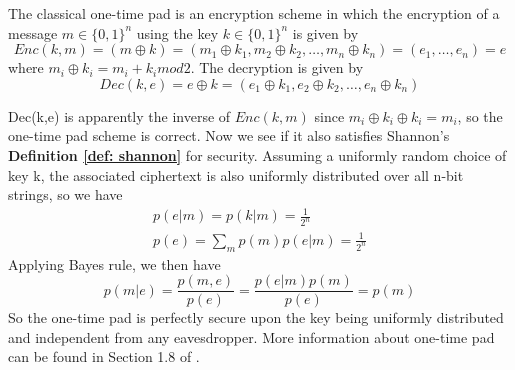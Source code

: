 
\begin{definition} \label{def: classical one-time pad scheme}
The classical one-time pad is an encryption scheme in which the encryption of a message $m \in \{0, 1\}^n$ using the key $k \in \{0, 1\}^n$ is given by
\begin{equation}
    Enc(k,m)=(m \oplus k)=(m_1 \oplus k_1, m_2 \oplus k_2, \hdots, m_n \oplus k_n)=(e_1, \hdots, e_n)=e
\end{equation}
where $m_i \oplus k_i = m_i + k_i mod 2$. The decryption is given by
\begin{equation}
Dec(k, e)=e \oplus k = (e_1 \oplus k_1, e_2 \oplus k_2, \hdots, e_n \oplus k_n)
\end{equation}
\end{definition}

Dec(k,e) is apparently the inverse of $Enc(k,m)$ since $m_i \oplus k_i \oplus k_i=m_i$, so the one-time pad scheme is correct. Now we see if it also satisfies Shannon's \textbf{Definition \ref{def: shannon}} for security. Assuming a uniformly random choice of key k, the associated ciphertext is also uniformly distributed over all n-bit strings, so we have 
\begin{gather}
    p(e|m)=p(k|m)=\frac{1}{2^n}\\
    p(e)=\sum_m p(m) p(e|m)=\frac{1}{2^n}
\end{gather}
Applying Bayes rule, we then have $$p(m|e)=\frac{p(m,e)}{p(e)}=\frac{p(e|m)p(m)}{p(e)}=p(m)$$
So the one-time pad is perfectly secure upon the key being uniformly distributed and independent from any eavesdropper. More information about one-time pad can be found in Section 1.8 of \cite{Wehner:notes}.

